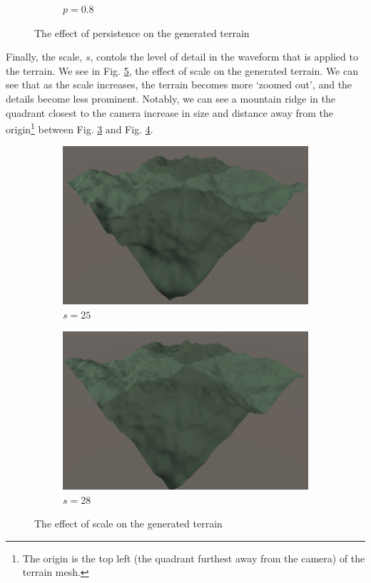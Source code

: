 \documentclass[12pt]{article}
\begin{document}
\begin{figure}[H]
\begin{subfigure}{0.3\textwidth}
        \caption{$p=0.8$}
        \label{fig:persistence0.8}
    \end{subfigure}
    \caption{The effect of persistence on the generated terrain}
    \label{fig:persistence}
\end{figure}

Finally, the scale, $s$, contols the level of detail in the waveform that is applied to the terrain. We see in Fig. \ref{fig:scale}, the effect of scale on the generated terrain. We can see that as the scale increases, the terrain becomes more `zoomed out', and the details become less prominent. Notably, we can see a mountain ridge in the quadrant closest to the camera increase in size and distance away from the origin\footnote{The origin is the top left (the quadrant furthest away from the camera) of the terrain mesh.} between Fig. \ref{fig:scale25} and Fig. \ref{fig:scale28}.

\begin{figure}[H]
    \centering
    \begin{subfigure}{0.45\textwidth}
        \centering
        \includegraphics[width=\linewidth]{scale25.png}
        \caption{$s=25$}
        \label{fig:scale25}
    \end{subfigure}
    \hfill
    \begin{subfigure}{0.45\textwidth}
        \centering
        \includegraphics[width=\linewidth]{scale28.png}
        \caption{$s=28$}
        \label{fig:scale28}
    \end{subfigure}
    \caption{The effect of scale on the generated terrain}
    \label{fig:scale}
\end{figure}
\end{document}
